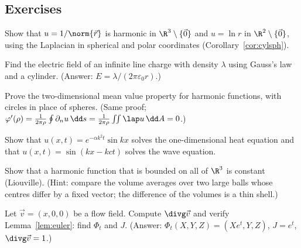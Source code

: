 \subsection*{Exercises}
\begin{exercise}
Show that $u=1/\norm{\vec r}$ is harmonic in $\R^3\setminus\{\vec0\}$ and $u=\ln r$ in $\R^2\setminus\{\vec0\}$, using the Laplacian in spherical and polar coordinates (Corollary~\ref{cor:cylsph}).
\end{exercise}
\begin{exercise}
Find the electric field of an infinite line charge with density $\lambda$ using Gauss's law and a cylinder. (Answer: $E=\lambda/(2\pi\varepsilon_0r)$.)
\end{exercise}
\begin{exercise}
Prove the two-dimensional mean value property for harmonic functions, with circles in place of spheres. (Same proof; $\varphi'(\rho)=\frac1{2\pi\rho}\oint\partial_nu\,\dd s=\frac1{2\pi\rho}\iint\lap u\,\dd A=0$.)
\end{exercise}
\begin{exercise}
Show that $u(x,t)=e^{-\alpha k^2t}\sin kx$ solves the one-dimensional heat equation and that $u(x,t)=\sin(kx-kct)$ solves the wave equation.
\end{exercise}
\begin{exercise}
Show that a harmonic function that is bounded on all of $\R^3$ is constant (Liouville). (Hint: compare the volume averages over two large balls whose centres differ by a fixed vector; the difference of the volumes is a thin shell.)
\end{exercise}
\begin{exercise}
Let $\vec v=(x,0,0)$ be a flow field. Compute $\divg\vec v$ and verify Lemma~\ref{lem:euler}: find $\Phi_t$ and $J$. (Answer: $\Phi_t(X,Y,Z)=(Xe^t,Y,Z)$, $J=e^t$, $\divg\vec v=1$.)
\end{exercise}
